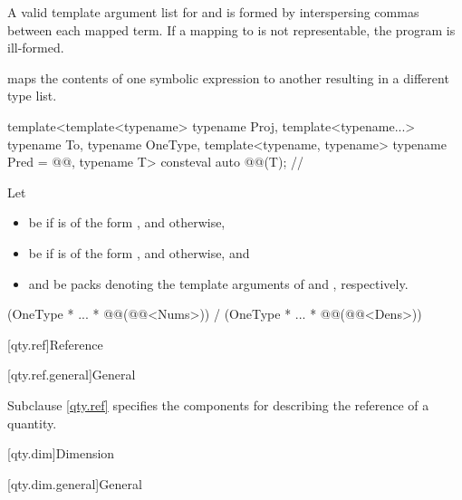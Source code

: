 \begin{itemdescr}
\pnum
\remarks
A valid template argument list for  and 
is formed by interspersing commas between each mapped term.
If a mapping to  is not representable,
the program is ill-formed.
\end{itemdescr}

\pnum
{} maps the contents of one symbolic expression to another resulting in a different type list.

\begin{itemdecl}
template<template<typename> typename Proj, template<typename...> typename To, typename OneType,
         template<typename, typename> typename Pred = @@, typename T>
consteval auto @@(T);  // \expos
\end{itemdecl}

\begin{itemdescr}
\pnum
Let
\begin{itemize}
\item
{} be
 if  is of the form , and
 otherwise,
\item
{} be
 if  is of the form , and
 otherwise, and
\item
{} and 
be packs denoting the template arguments of
 and , respectively.
\end{itemize}

\pnum
\returns
\begin{codeblock}
(OneType{} * ... * @@(@@<Nums>{})) /
(OneType{} * ... * @@(@@<Dens>{}))
\end{codeblock}
\end{itemdescr}

[qty.ref]{Reference}

[qty.ref.general]{General}

\pnum
Subclause \ref{qty.ref} specifies the components
for describing the reference of a quantity.

[qty.dim]{Dimension}

[qty.dim.general]{General}

